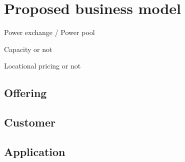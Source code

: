 \section{Proposed business model}
Power exchange / Power pool

Capacity or not

Locational pricing or not
\subsection{Offering}

\subsection{Customer}

\subsection{Application}






